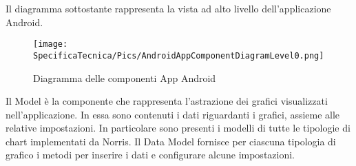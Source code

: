     Il diagramma sottostante rappresenta la vista ad alto livello dell'applicazione Android.
   
    \begin{figure}[H]\centering
        \texttt{[image: SpecificaTecnica/Pics/AndroidAppComponentDiagramLevel0.png]}
        \caption{Diagramma delle componenti App Android}
    \end{figure}

        Il Model è la componente che rappresenta l'astrazione dei grafici visualizzati nell'applicazione. In essa sono contenuti i dati riguardanti i grafici, assieme alle relative impostazioni. In particolare sono presenti i modelli di tutte le tipologie di chart implementati da Norris. Il Data Model fornisce per ciascuna tipologia di grafico i metodi per inserire i dati e configurare alcune impostazioni. 
    
